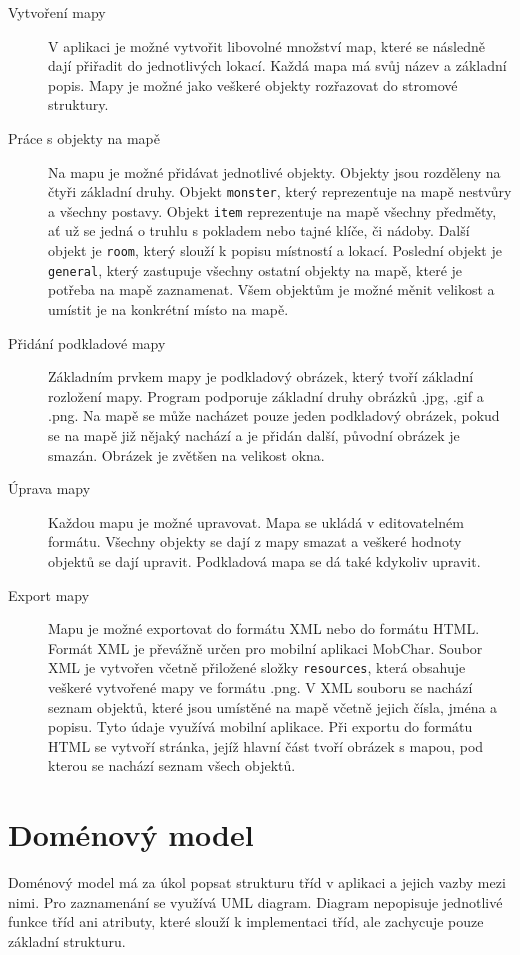 \documentclass[thesis=B,czech]{resources/FITthesis}[2012/06/26]
\begin{document}
	\begin{description}
		\item[Vytvoření mapy]
V aplikaci je možné vytvořit libovolné množství map, které se následně dají přiřadit do jednotlivých lokací. Každá mapa má svůj název a základní popis. Mapy je možné jako veškeré objekty rozřazovat do stromové struktury. 

		\item[Práce s objekty na mapě]
Na mapu je možné přidávat jednotlivé objekty. Objekty jsou rozděleny na čtyři základní druhy. Objekt \texttt{monster}, který reprezentuje na mapě nestvůry a všechny postavy. Objekt \texttt{item} reprezentuje na mapě všechny předměty, ať už se jedná o truhlu s pokladem nebo tajné klíče, či nádoby. Další objekt je \texttt{room}, který slouží k popisu místností a lokací. Poslední objekt je \texttt{general}, který zastupuje všechny ostatní objekty na mapě, které je potřeba na mapě zaznamenat. Všem objektům je možné měnit velikost a umístit je na konkrétní místo na mapě.

		\item[Přidání podkladové mapy]
Základním prvkem mapy je podkladový obrázek, který tvoří základní rozložení mapy. Program podporuje základní druhy obrázků .jpg, .gif a .png. Na mapě se může nacházet pouze jeden podkladový obrázek, pokud se na mapě již nějaký nachází a je přidán další, původní obrázek je smazán. Obrázek je zvětšen na velikost okna.

		\item[Úprava mapy]
Každou mapu je možné upravovat. Mapa se ukládá v editovatelném formátu. Všechny objekty se dají z mapy smazat a veškeré hodnoty objektů se dají upravit. Podkladová mapa se dá také kdykoliv upravit.  
		
		\item[Export mapy]
Mapu je možné exportovat do formátu XML nebo do formátu HTML. Formát XML je převážně určen pro mobilní aplikaci MobChar. Soubor XML je vytvořen včetně přiložené složky \texttt{resources}, která obsahuje veškeré vytvořené mapy ve formátu .png. V XML souboru se nachází seznam objektů, které jsou umístěné na mapě včetně jejich čísla, jména a popisu. Tyto údaje využívá mobilní aplikace. Při exportu do formátu HTML se vytvoří stránka, jejíž hlavní část tvoří obrázek s mapou, pod kterou se nachází seznam všech objektů.

	\end{description}
	\section{Doménový model}
Doménový model má za úkol popsat strukturu tříd v aplikaci a jejich vazby mezi nimi. Pro zaznamenání se využívá UML diagram. Diagram nepopisuje jednotlivé funkce tříd ani atributy, které slouží k implementaci tříd, ale zachycuje pouze základní strukturu.
\end{document}
